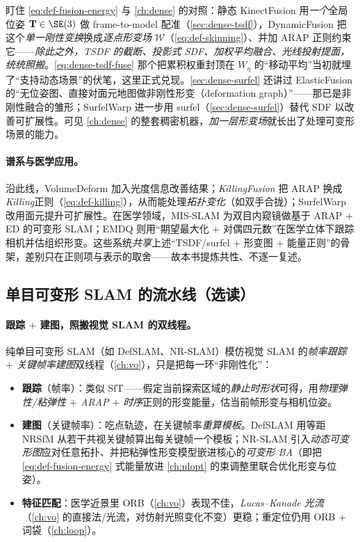 \begin{insight}[非刚性融合 $=$ \cref{ch:dense} 的 TSDF $+$ 一层形变场]
盯住 \cref{eq:def-fusion-energy} 与 \cref{ch:dense} 的对照：静态 KinectFusion 用\emph{一个}全局位姿 $\mathbf{T}\in\SE(3)$ 做 frame-to-model 配准（\cref{sec:dense-tsdf}），DynamicFusion 把这个\emph{单一刚性变换}换成\emph{逐点形变场} $\mathcal{W}$（\cref{eq:def-skinning}）、并加 ARAP 正则约束它——\emph{除此之外，TSDF 的截断、投影式 SDF、加权平均融合、光线投射提面，统统照搬}。\cref{eq:dense-tsdf-fuse} 那个把累积权重封顶在 $W_\eta$ 的“移动平均”当初就埋了“支持动态场景”的伏笔，这里正式兑现。\cref{sec:dense-surfel} 还讲过 ElasticFusion 的“无位姿图、直接对面元地图做非刚性形变（deformation graph）”——那已是非刚性融合的雏形；SurfelWarp 进一步用 surfel（\cref{sec:dense-surfel}）替代 SDF 以改善可扩展性。可见 \cref{ch:dense} 的整套稠密机器，\emph{加一层形变场}就长出了处理可变形场景的能力。
\end{insight}

\paragraph{谱系与医学应用。}
沿此线，VolumeDeform 加入光度信息改善结果；\emph{KillingFusion}\cite{slavcheva2017killingfusion} 把 ARAP 换成\emph{Killing}正则（\cref{eq:def-killing}），从而能处理\emph{拓扑变化}（如双手合拢）；SurfelWarp 改用面元提升可扩展性。在医学领域，MIS-SLAM 为双目内窥镜做基于 ARAP $+$ ED 的可变形 SLAM；EMDQ 则用“期望最大化 $+$ 对偶四元数”在医学立体下跟踪相机并估组织形变。这些系统\emph{共享}上述“TSDF/surfel $+$ 形变图 $+$ 能量正则”的骨架，差别只在正则项与表示的取舍——故本书提炼共性、不逐一复述。

\subsection{单目可变形 SLAM 的流水线（选读）}
\label{sec:dynamic-mono-deform}

\paragraph{跟踪 $+$ 建图，照搬视觉 SLAM 的双线程。}
纯单目可变形 SLAM（如 DefSLAM、NR-SLAM）模仿视觉 SLAM 的\emph{帧率跟踪 $+$ 关键帧率建图}双线程（\cref{ch:vo}），只是把每一环“非刚性化”\cite{schmid2026dynamic}：
\begin{itemize}
  \item \textbf{跟踪}（帧率）：类似 SfT——假定当前探索区域的\emph{静止时形状}可得，用\emph{物理弹性/粘弹性 $+$ ARAP $+$ 时序}正则的形变能量，估当前帧形变与相机位姿。
  \item \textbf{建图}（关键帧率）：吃点轨迹，在关键帧率\emph{重算模板}。DefSLAM 用等距 NRSfM 从若干共视关键帧算出每关键帧一个模板；NR-SLAM 引入\emph{动态可变形图}应对任意拓扑、并把粘弹性形变模型嵌进核心的\emph{可变形 BA}（即把 \cref{eq:def-fusion-energy} 式能量放进 \cref{ch:nlopt} 的束调整里联合优化形变与位姿）。
  \item \textbf{特征匹配}：医学近景里 ORB（\cref{ch:vo}）表现不佳，\emph{Lucas--Kanade 光流}（\cref{ch:vo} 的直接法/光流，对仿射光照变化不变）更稳；重定位仍用 ORB $+$ 词袋（\cref{ch:loop}）。
\end{itemize}

